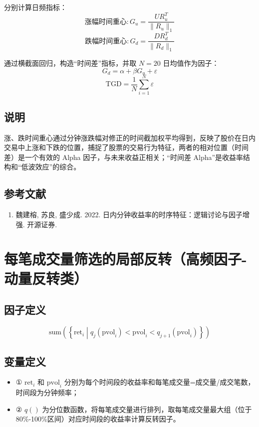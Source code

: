 \documentclass{article}
\begin{document}
分别计算日频指标：
\begin{equation}
    \text{涨幅时间重心}: G_u = \frac{U R_u^T}{\|R_u\|_1}
\end{equation}
\begin{equation}
    \text{跌幅时间重心}: G_d = \frac{D R_d^T}{\|R_d\|_1}
\end{equation}

通过横截面回归，构造“时间差”指标，并取 \( N=20 \) 日均值作为因子：
\begin{equation}
    G_d = \alpha + \beta G_u + \varepsilon
\end{equation}
\begin{equation}
    \mathrm{TGD} = \frac{1}{N} \sum_{i=1}^N \varepsilon
\end{equation}

\subsection{说明}
涨、跌时间重心通过分钟涨跌幅对修正的时间截加权平均得到，反映了股价在日内交易中上涨和下跌的位置，捕捉了股票的交易行为特征，两者的相对位置（时间差）是一个有效的 Alpha 因子，与未来收益正相关；“时间差 Alpha”是收益率结构和“低波效应”的综合。

\subsection{参考文献}
\begin{enumerate}
    \item 魏建榕, 苏良, 盛少成. 2022. 日内分钟收益率的时序特征：逻辑讨论与因子增强. 开源证券.
\end{enumerate}

\section{每笔成交量筛选的局部反转（高频因子-动量反转类）}

\subsection{因子定义}
\begin{equation}
    \mathrm{sum}\left( \left\{ \mathrm{ret}_i \middle| q_j(\mathrm{pvol}_i) < \mathrm{pvol}_i < q_{j+1}(\mathrm{pvol}_i) \right\} \right)
\end{equation}

\subsection{变量定义}
\begin{itemize}
    \item ① \(\mathrm{ret}_i\) 和 \(\mathrm{pvol}_i\) 分别为每个时间段的收益率和每笔成交量=成交量/成交笔数，时间段为分钟频率；
    \item ② \(q()\) 为分位数函数，将每笔成交量进行排列，取每笔成交量最大组（位于80\%-100\%区间）对应时间段的收益率计算反转因子。
\end{itemize}
\end{document}
